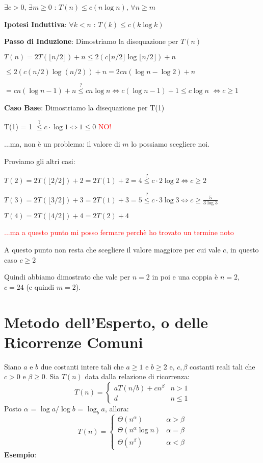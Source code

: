 \documentclass[../cheatSheetAlgoritmi.tex]{subfiles}
\begin{document}
$\exists c > 0$, $\exists m \geq 0$ : $T(n) \leq c(n\log{n})$, $\forall n \geq m$

\bigskip

\textbf{Ipotesi Induttiva}: $\forall k < n$ : $T(k) \leq c(k\log{k})$

\textbf{Passo di Induzione}: Dimostriamo la disequazione per $T(n)$

$T(n) = 2T(\lfloor n/2 \rfloor) + n \leq 2(c \lfloor n/2 \rfloor \log{\lfloor n/2 \rfloor}) + n$

$\leq 2(c(n/2) \log{(n/2)}) + n = 2cn(\log{n} - \log{2}) + n$

$= cn(\log{n} - 1) + n \stackrel{?}{\leq} cn\log{n} \iff c(\log{n}-1) + 1 \leq c \log{n}$ 
$\iff c \geq 1$

\textbf{Caso Base}: Dimostriamo la disequazione per T(1)

T(1) = 1 $\stackrel{?}{\leq} c \cdot \log{1} \iff 1 \leq 0$ \textcolor{red}{NO!}

...ma, non è un problema: il valore di $m$ lo possiamo scegliere noi.

Proviamo gli altri casi:

$T(2) = 2T(\lfloor 2/2 \rfloor) + 2 = 2T(1) + 2 = 4 \stackrel{?}{\leq} c \cdot 2 \log{2} \iff c \geq 2$

$T(3) = 2T(\lfloor 3/2 \rfloor) + 3 = 2T(1) + 3 = 5 \stackrel{?}{\leq} c \cdot 3 \log{3} \iff c \geq \frac{5}{3 \log{3}}$

$T(4) = 2T(\lfloor 4/2 \rfloor) + 4 = 2T(2) + 4$

\textcolor{red}{...ma a questo punto mi posso fermare perchè ho trovato un termine noto}

A questo punto non resta che scegliere il valore maggiore per cui vale $c$, in questo caso $c \geq 2$

Quindi abbiamo dimostrato che vale per $n = 2$ in poi e una coppia è $n = 2$, $c = 24$ (e quindi $m = 2$).

\section{Metodo dell'Esperto, o delle Ricorrenze Comuni}
Siano $a$ e $b$ due costanti intere tali che $a \geq 1$ e $b \geq 2$ e, $c, \beta$ costanti reali tali che $c > 0$ e $\beta \geq 0$. Sia $T(n)$ data dalla relazione di ricorrenza:
	\begin{equation*}
  		T(n)=\begin{cases}
    		aT(n/b) + cn^{\beta} & \text{$n > 1$}\\
    		d & \text{$n \leq 1$}
  		\end{cases}	
	\end{equation*}
Posto $\alpha$ = $\log{a}/\log{b}$ = $\log_{b}{a}$, allora:
	\begin{equation*}
  		T(n)=\begin{cases}
			\Theta(n^{\alpha}) & \text{$\alpha > \beta$}\\
    		\Theta(n^{\alpha} \log{n}) & \text{$\alpha = \beta$}\\
    		\Theta(n^{\beta}) & \text{$\alpha < \beta$}
  		\end{cases}
	\end{equation*}
\textbf{Esempio}:
\end{document}
